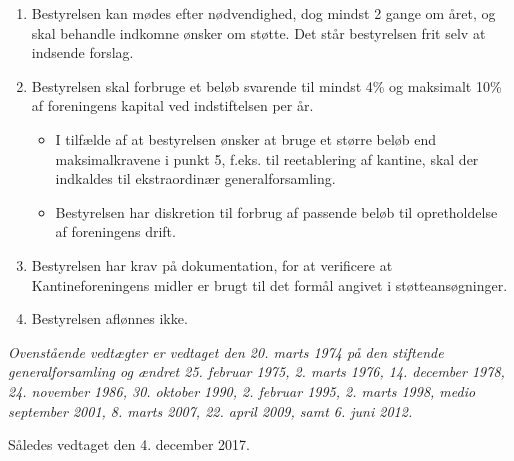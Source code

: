 \documentclass[a4paper, 10pt]{article}
\def\vedtagsdato{den 4. december 2017}
\begin{document}
\begin{enumerate}
\item Bestyrelsen kan mødes efter nødvendighed, dog mindst 2 gange om
året, og skal behandle indkomne ønsker om støtte. Det står bestyrelsen
frit selv at indsende forslag.

\item Bestyrelsen skal forbruge et beløb svarende til mindst 4\% og
maksimalt 10\% af foreningens kapital ved indstiftelsen per år.

\begin{itemize}

\item I tilfælde af at bestyrelsen ønsker at bruge et større beløb end
maksimalkravene i punkt 5, f.eks. til reetablering af kantine, skal
der indkaldes til ekstraordinær generalforsamling.

\item Bestyrelsen har diskretion til forbrug af passende beløb til
opret\-holdelse af foreningens drift.

\end{itemize}

\item Bestyrelsen har krav på dokumentation, for at verificere at
Kantinefor\-eningens midler er brugt til det formål angivet i
støtteansøgninger.

\item Bestyrelsen aflønnes ikke.

\end{enumerate}

\vspace{\fill}

\noindent \emph{Ovenstående vedtægter er vedtaget den 20. marts 1974
på den stiftende generalforsamling og ændret 25.  februar 1975, 2.
marts 1976, 14. december 1978, 24. november 1986, 30.  oktober 1990,
2.  februar 1995, 2. marts 1998, medio september 2001, 8. marts 2007,
22. april 2009, samt 6. juni 2012.}

\bigskip

\noindent Således vedtaget \vedtagsdato{}.
\end{document}
